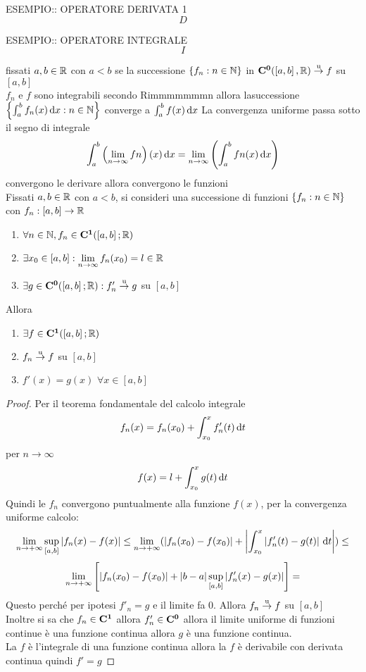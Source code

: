 ESEMPIO:: OPERATORE DERIVATA 1\\
$$D$$

ESEMPIO:: OPERATORE INTEGRALE\\
$$I$$

\proposition
fissati $a,b\in \mathbb{R}$ con $a<b$ se la successione $\left\{f_n:n\in\mathbb{N}\right\}$ in $\mathbf{C^{0}}(\left[a,b\right], \mathbb{R}) \overset{\text{u}}{\to} f$ su $\left[a,b\right]$\\
$f_n$ e $f$ sono integrabili secondo Rimmmmmmmn allora lasuccessione $\left\{\int_a^bf_n(x)\,\mathrm{d}{x}:n\in\mathbb{N}\right\}$ converge a $\int_a^bf(x)\,\mathrm{d}{x}$
\observation
La convergenza uniforme passa sotto il segno di integrale
$$\int_a^b\left(\lim\limits_{n\to\infty}fn\right)(x)\,\mathrm{d}{x}=\lim\limits_{n\to\infty}\left(\int_a^bfn(x)\,\mathrm{d}{x}\right)$$
\proposition convergono le derivare allora convergono le funzioni\\
Fissati $a,b\in \mathbb{R}$ con $a<b$, si consideri una successione di funzioni $\left\{f_n:n\in\mathbb{N}\right\}$ con $f_n:\left[a,b\right]\to \mathbb{R}$
\begin{enumerate}
	\item $\forall n\in\mathbb{N}, f_n\in \mathbf{C^{1}}(\left[a,b\right]; \mathbb{R})$
	\item $\exists x_0\in\left[a,b\right]: \lim\limits_{n\to\infty}f_n(x_0)=l\in \mathbb{R}$
	\item $\exists g \in \mathbf{C^{0}}(\left[a,b\right]; \mathbb{R}):f'_n \overset{\text{u}}{\to} g$ su $\left[a,b\right]$
\end{enumerate}
Allora
\begin{enumerate}
	\item $\exists f\in \mathbf{C^{1}}(\left[a,b\right]; \mathbb{R})$
	\item $f_n \overset{\text{u}}{\to} f$ su $\left[a,b\right]$
	\item $f'(x)=g(x)$ $\forall x\in\left[a,b\right]$
\end{enumerate}
\begin{proof}
	Per il teorema fondamentale del calcolo integrale
	$$f_n(x)=f_n(x_0)+\int_{x_0}^{x}f_n'(t)\,\mathrm{d}{t}$$
	per $n\to\infty$
	$$f(x)=l+\int_{x_0}^{x}g(t)\,\mathrm{d}{t}$$
	Quindi le $f_n$ convergono puntualmente alla funzione $f(x)$, per la convergenza uniforme calcolo:
	$$ \lim\limits_{n\to+\infty}\sup\limits_{\left[a,b\right]}\left|f_n(x)-f(x)\right|\le\lim\limits_{n\to+\infty}(\left|f_n(x_0)-f(x_0)\right|+\left|\int_{x_0}^x \left|f_n'(t)-g(t)\right|\,\mathrm{d}{t}\right|)\le$$
	$$\lim\limits_{n\to+\infty}\left[ \left|f_n(x_0)-f(x_0)\right|+\left|b-a\right|\sup\limits_{\left[a,b\right]}\left|f_n'(x)-g(x)\right| \right] = $$
	Questo perché per ipotesi $f'_n=g$ e il limite fa $0$.
	Allora $f_n \overset{\text{u}}{\to} f$ su $\left[a,b\right]$\\
	Inoltre si sa che $f_n\in \mathbf{C^{1}}$ allora $f_n'\in \mathbf{C^{0}}$ allora il limite uniforme di funzioni continue è una funzione continua allora $g$ è una funzione continua.\\
	La $f$ è l'integrale di una funzione continua allora la $f$ è derivabile con derivata continua quindi $f'=g$
\end{proof}
